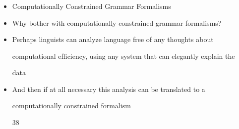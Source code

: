 \documentclass[compress,color=usenames]{beamer}
\begin{document}
\begin{frame}
\frametitle{}

\begin{itemize}
\item

Computationally Constrained Grammar Formalisms





\item Why bother with computationally constrained grammar formalisms?





\item Perhaps linguists can analyze language free of any thoughts about


computational efﬁciency, using any system that can elegantly explain the


data





\item And then if at all necessary this analysis can be translated to a


computationally constrained formalism





38




\end{itemize}

\end{frame}
\end{document}
